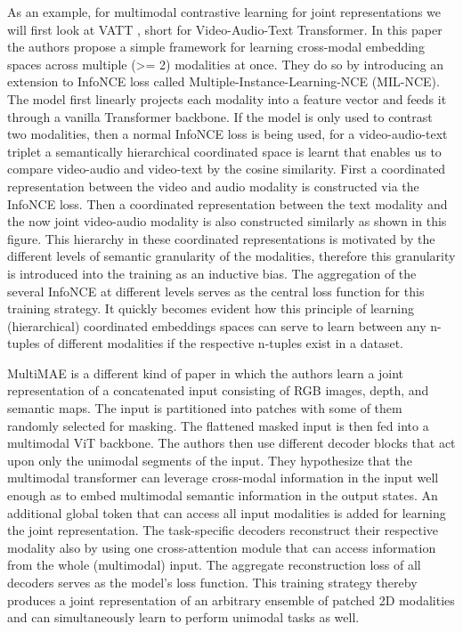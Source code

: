\documentclass[
]{krantz}
\begin{document}
As an example, for multimodal contrastive learning for joint representations we will first look at VATT \citep{DBLP:conf/nips/AkbariYQCCCG21}, short for Video-Audio-Text Transformer. In this paper the authors propose a simple framework for learning cross-modal embedding spaces across multiple (\textgreater= 2) modalities at once. They do so by introducing an extension to InfoNCE loss called Multiple-Instance-Learning-NCE (MIL-NCE). The model first linearly projects each modality into a feature vector and feeds it through a vanilla Transformer backbone. If the model is only used to contrast two modalities, then a normal InfoNCE loss is being used, for a video-audio-text triplet a semantically hierarchical coordinated space is learnt that enables us to compare video-audio and video-text by the cosine similarity. First a coordinated representation between the video and audio modality is constructed via the InfoNCE \citep{DBLP:conf/icml/ChenK0H20} loss. Then a coordinated representation between the text modality and the now joint video-audio modality is also constructed similarly as shown in this figure. This hierarchy in these coordinated representations is motivated by the different levels of semantic granularity of the modalities, therefore this granularity is introduced into the training as an inductive bias. The aggregation of the several InfoNCE at different levels serves as the central loss function for this training strategy. It quickly becomes evident how this principle of learning (hierarchical) coordinated embeddings spaces can serve to learn between any n-tuples of different modalities if the respective n-tuples exist in a dataset.

MultiMAE \citep{bachmann2022multimae} is a different kind of paper in which the authors learn a joint representation of a concatenated input consisting of RGB images, depth, and semantic maps. The input is partitioned into patches with some of them randomly selected for masking. The flattened masked input is then fed into a multimodal ViT \citep{DosovitskiyB0WZ21} backbone. The authors then use different decoder blocks that act upon only the unimodal segments of the input. They hypothesize that the multimodal transformer can leverage cross-modal information in the input well enough as to embed multimodal semantic information in the output states. An additional global token that can access all input modalities is added for learning the joint representation. The task-specific decoders reconstruct their respective modality also by using one cross-attention module that can access information from the whole (multimodal) input. The aggregate reconstruction loss of all decoders serves as the model's loss function. This training strategy thereby produces a joint representation of an arbitrary ensemble of patched 2D modalities and can simultaneously learn to perform unimodal tasks as well.
\end{document}
